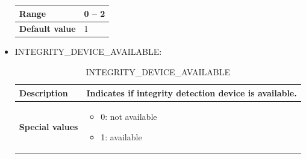 \documentclass{template/openetcs}
\begin{document}
\begin{itemize}
\begin{longtable}{|l|l|}
				\hline
																																									
					\begin{minipage}[t]{0.22\linewidth} \textbf{Range}	\end{minipage} 
				&	\begin{minipage}[t]{0.78\linewidth} 0 – 2 \end{minipage} \\
				
				\hline
				
					\begin{minipage}[t]{0.22\linewidth} \textbf{Default value}	\end{minipage} 
				&	\begin{minipage}[t]{0.78\linewidth} 1 \end{minipage} \\
				
				\hline
				
			\end{longtable}
			
		\item INTEGRITY\_DEVICE\_AVAILABLE:
						
			\begin{longtable}{|l|l|}
				\caption{INTEGRITY\_DEVICE\_AVAILABLE}\\ 
				\hline
				
					\begin{minipage}[t]{0.22\linewidth} \textbf{Description}	\end{minipage} 
				&	\begin{minipage}[t]{0.78\linewidth} Indicates if integrity detection device is available. \end{minipage} \\
				
				\hline
																																									
					\begin{minipage}[t]{0.22\linewidth} \textbf{Special values}	\end{minipage} 
				&	\begin{minipage}[t]{0.78\linewidth} \begin{itemize} \item 0: not available \item 1: available \end{itemize} \end{minipage} \\
				
				\hline
				

\end{longtable}
\end{itemize}
\end{document}
